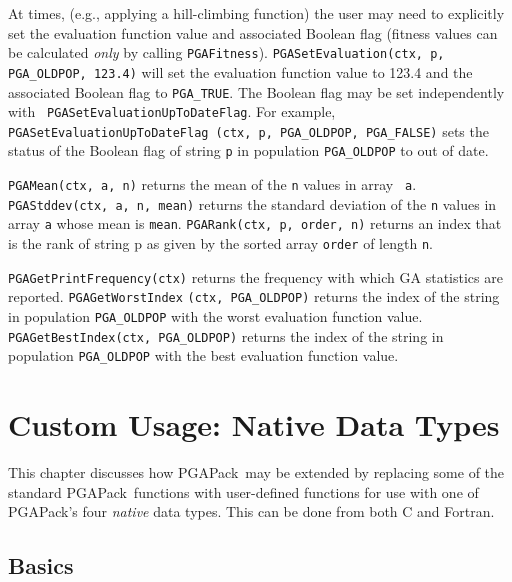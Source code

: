 \documentclass{report}
\newcommand{\pga}{PGAPack}
\begin{document}
\begin{sloppypar}
At times, (e.g., applying a hill-climbing function) the user may need to
explicitly set the evaluation function value and associated Boolean flag
(fitness values can be calculated {\em only} by calling {\tt PGAFitness}).
{\tt PGASetEvaluation(ctx, p, PGA\_OLDPOP, 123.4)} will set the evaluation
function value to 123.4 and the associated Boolean flag to {\tt PGA\_TRUE}.
The Boolean flag may be set independently with {\tt
PGASetEvaluationUpToDateFlag}.  For example, {\tt PGASetEvaluationUpToDateFlag
(ctx, p, PGA\_OLDPOP, PGA\_FALSE)} sets the status of the Boolean flag of
string {\tt p} in population {\tt PGA\_OLDPOP} to out of date.
\end{sloppypar}

{\tt PGAMean(ctx, a, n)} returns the mean of the {\tt n} values in array {\tt
a}. {\tt PGAStddev(ctx, a, n, mean)} returns the standard deviation of the
{\tt n} values in array {\tt a} whose mean is {\tt mean}.  {\tt PGARank(ctx,
p, order, n)} returns an index that is the rank of string p as given by the
sorted array {\tt order} of length {\tt n}.

\begin{sloppypar}
{\tt PGAGetPrintFrequency(ctx)} returns the frequency with which GA statistics
are reported. {\tt PGAGetWorstIndex} {\tt (ctx, PGA\_OLDPOP)} returns the
index of the string in population {\tt PGA\_OLDPOP} with the worst evaluation
function value.  {\tt PGAGetBestIndex(ctx, PGA\_OLDPOP)} returns the index of
the string in population {\tt PGA\_OLDPOP} with the best evaluation function
value.
\end{sloppypar}


\chapter{Custom Usage: Native Data Types}\label{chp:custom1}

This chapter discusses how \pga\ may be extended by replacing some of the
standard \pga\ functions with user-defined functions for use with one of
\pga's four {\em native}  data types.  This can be done from both C and
Fortran. 

\section{Basics}
\end{document}
